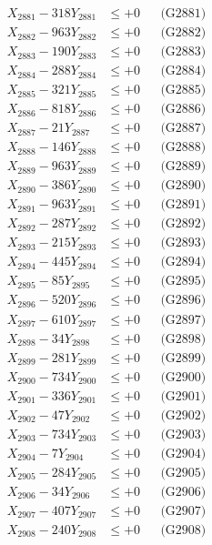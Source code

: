\documentclass[a4paper,10pt]{article}
\begin{document}
{\begin{align}
\allowbreak
X_{2881} - 318Y_{2881} &\leq +0 && \text{(G2881)} \\
X_{2882} - 963Y_{2882} &\leq +0 && \text{(G2882)} \\
X_{2883} - 190Y_{2883} &\leq +0 && \text{(G2883)} \\
X_{2884} - 288Y_{2884} &\leq +0 && \text{(G2884)} \\
X_{2885} - 321Y_{2885} &\leq +0 && \text{(G2885)} \\
X_{2886} - 818Y_{2886} &\leq +0 && \text{(G2886)} \\
X_{2887} - 21Y_{2887} &\leq +0 && \text{(G2887)} \\
X_{2888} - 146Y_{2888} &\leq +0 && \text{(G2888)} \\
X_{2889} - 963Y_{2889} &\leq +0 && \text{(G2889)} \\
X_{2890} - 386Y_{2890} &\leq +0 && \text{(G2890)} \\
\allowbreak
X_{2891} - 963Y_{2891} &\leq +0 && \text{(G2891)} \\
X_{2892} - 287Y_{2892} &\leq +0 && \text{(G2892)} \\
X_{2893} - 215Y_{2893} &\leq +0 && \text{(G2893)} \\
X_{2894} - 445Y_{2894} &\leq +0 && \text{(G2894)} \\
X_{2895} - 85Y_{2895} &\leq +0 && \text{(G2895)} \\
X_{2896} - 520Y_{2896} &\leq +0 && \text{(G2896)} \\
X_{2897} - 610Y_{2897} &\leq +0 && \text{(G2897)} \\
X_{2898} - 34Y_{2898} &\leq +0 && \text{(G2898)} \\
X_{2899} - 281Y_{2899} &\leq +0 && \text{(G2899)} \\
X_{2900} - 734Y_{2900} &\leq +0 && \text{(G2900)} \\
\allowbreak
X_{2901} - 336Y_{2901} &\leq +0 && \text{(G2901)} \\
X_{2902} - 47Y_{2902} &\leq +0 && \text{(G2902)} \\
X_{2903} - 734Y_{2903} &\leq +0 && \text{(G2903)} \\
X_{2904} - 7Y_{2904} &\leq +0 && \text{(G2904)} \\
X_{2905} - 284Y_{2905} &\leq +0 && \text{(G2905)} \\
X_{2906} - 34Y_{2906} &\leq +0 && \text{(G2906)} \\
X_{2907} - 407Y_{2907} &\leq +0 && \text{(G2907)} \\
X_{2908} - 240Y_{2908} &\leq +0 && \text{(G2908)} \\

\end{align}}
\end{document}
